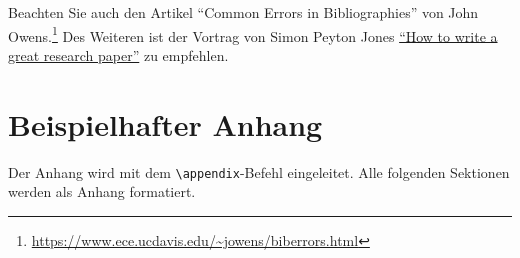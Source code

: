 \documentclass{hhuarticle}
\begin{document}
  Beachten Sie auch den Artikel
  ``Common Errors in Bibliographies''
  von John Owens.\footnote{%
    \url{https://www.ece.ucdavis.edu/~jowens/biberrors.html}}
  Des Weiteren ist der Vortrag von Simon Peyton Jones \href{https://www.microsoft.com/en-us/research/academic-program/write-great-research-paper/}{``How to write a great research paper''} zu empfehlen.

  \appendix
  \section{Beispielhafter Anhang}
  Der Anhang wird mit dem \texttt{\textbackslash{}appendix}-Befehl eingeleitet.
  Alle folgenden Sektionen werden als Anhang formatiert.

\backmatter
\listoffigures
\listoftables


\end{document}
